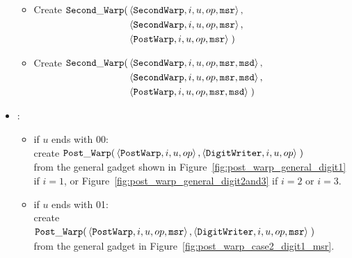\begin{itemize}
\begin{itemize}
        \item Create
        $\begin{aligned}[t]
            {\tt Second\_Warp}(& \left\langle {\tt SecondWarp}, i, u, op, {\tt msr} \right\rangle, \\
                        & \left\langle {\tt SecondWarp}, i, u, op, {\tt msr} \right\rangle, \\
                        & \left\langle {\tt PostWarp},   i, u, op, {\tt msr} \right\rangle \;)
        \end{aligned}$
        \vspace{0.5cm}

        \item Create
        $\begin{aligned}[t]
            {\tt Second\_Warp}(& \left\langle {\tt SecondWarp}, i, u, op, {\tt msr}, {\tt msd} \right\rangle, \\
                        & \left\langle {\tt SecondWarp}, i, u, op, {\tt msr}, {\tt msd} \right\rangle, \\
                        & \left\langle {\tt PostWarp},   i, u, op, {\tt msr}, {\tt msd} \right\rangle \;)
        \end{aligned}$
        \vspace{0.5cm}
        \end{itemize}

        \item {\postwarp}:
        \begin{itemize}
           \item if $u$ ends with 00:\\
            create
            $\begin{aligned}[t]
                {\tt Post\_Warp}(& \left \langle {\tt PostWarp},  i, u,   op \right\rangle,
                            \left \langle {\tt DigitWriter}, i, u, op \right\rangle \;)
            \end{aligned}$ \\
            from the general gadget shown in Figure~\ref{fig:post_warp_general_digit1} if $i = 1$,
            or Figure~\ref{fig:post_warp_general_digit2and3} if $ i = 2$ or $i = 3$.
            \vspace{.5cm}

            \item if $u$ ends with 01:\\
            create
            $\begin{aligned}[t]
                {\tt Post\_Warp}(& \left \langle {\tt PostWarp},    i, u, op, {\tt msr} \right\rangle,
                            \left \langle {\tt DigitWriter}, i, u, op, {\tt msr} \right\rangle \;)
            \end{aligned}$ \\
            from the general gadget in Figure~\ref{fig:post_warp_case2_digit1_msr}.
            \vspace{.5cm}


\end{itemize}
\end{itemize}
